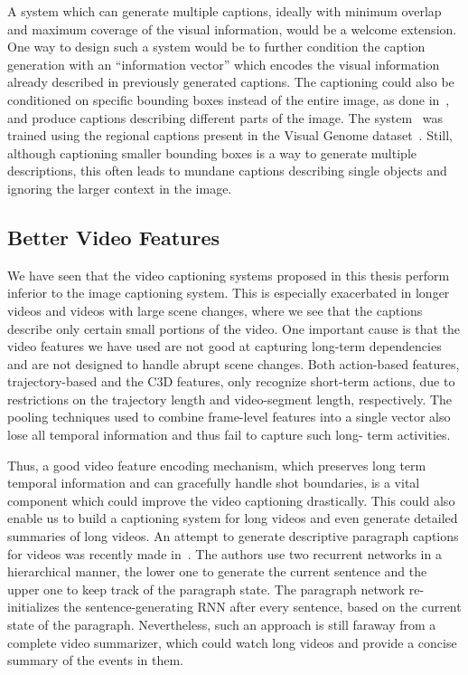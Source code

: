 A system which can generate multiple captions, ideally with minimum overlap and
maximum coverage of the visual information, would be a welcome extension.
One way to design such a system would be to further condition the caption
generation with an ``information vector'' which encodes the visual information
already described in previously generated captions.
The captioning could also be conditioned on specific bounding boxes
instead of the entire image, as done in~\cite{johnson2015densecap}, and produce
captions describing different parts of the image.
The system~\cite{johnson2015densecap} was trained using the regional captions
present in the Visual Genome dataset~\cite{krishnavisualgenome}.
Still, although captioning smaller bounding boxes is a way to generate multiple
descriptions, this often leads to mundane captions describing single objects
and ignoring the larger context in the image.

\subsection{Better Video Features}
We have seen that the video captioning systems proposed in this thesis perform
inferior to the image captioning system.
This is especially exacerbated in longer videos and videos with large scene
changes, where we see that the captions describe only certain small portions of
the video.
One important cause is that the video features we have used are not good at
capturing long-term dependencies and are not designed to handle abrupt scene
changes.
Both action-based features, trajectory-based and the C3D features, only
recognize short-term actions, due to restrictions on the trajectory length and
video-segment length, respectively.
The pooling techniques used to combine frame-level features into a single
vector also lose all temporal information and thus fail to capture such long-
term activities.

Thus, a good video feature encoding mechanism, which preserves long term temporal
information and can gracefully handle shot boundaries, is a vital component which
could improve the video captioning drastically.
This could also enable us to build a captioning system for long videos and even
generate detailed summaries of long videos.
An attempt to generate descriptive paragraph captions for videos was recently made 
in~\cite{yu2015video}.
The authors use two recurrent networks in a hierarchical manner, the lower one
to generate the current sentence and the upper one to keep track of the
paragraph state.
The paragraph network re-initializes the sentence-generating RNN after every
sentence, based on the current state of the paragraph.
Nevertheless, such an approach is still faraway from a complete video summarizer,
which could watch long videos and provide a concise summary of the events in
them.

